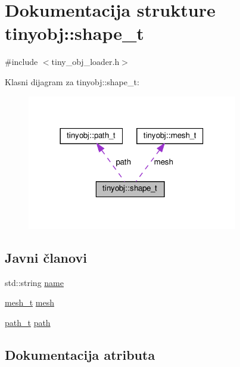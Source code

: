 \hypertarget{structtinyobj_1_1shape__t}{}\section{Dokumentacija strukture tinyobj\+:\+:shape\+\_\+t}
\label{structtinyobj_1_1shape__t}


{\ttfamily \#include $<$tiny\+\_\+obj\+\_\+loader.\+h$>$}



Klasni dijagram za tinyobj\+:\+:shape\+\_\+t\+:\nopagebreak
\begin{figure}[H]
\begin{center}
\leavevmode
\includegraphics[width=260pt]{structtinyobj_1_1shape__t__coll__graph}
\end{center}
\end{figure}
\subsection*{Javni članovi}
\begin{DoxyCompactItemize}
\item 
std\+::string \hyperlink{structtinyobj_1_1shape__t_a98650e2e66d00934f68de88eafb34630}{name}
\item 
\hyperlink{structtinyobj_1_1mesh__t}{mesh\+\_\+t} \hyperlink{structtinyobj_1_1shape__t_a3dacb06dfbfe9e245ff4bc7b5b3d9818}{mesh}
\item 
\hyperlink{structtinyobj_1_1path__t}{path\+\_\+t} \hyperlink{structtinyobj_1_1shape__t_a3e25b80e1330260be137eb865ec0b958}{path}
\end{DoxyCompactItemize}


\subsection{Dokumentacija atributa}
\mbox{\label{structtinyobj_1_1shape__t_a3dacb06dfbfe9e245ff4bc7b5b3d9818}} 
